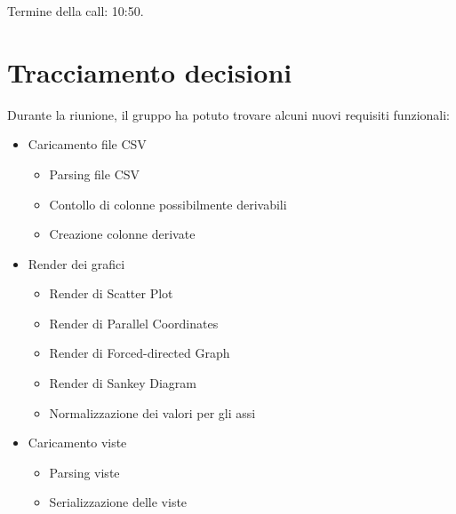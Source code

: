 \noindent Termine della call: 10:50.

\section{Tracciamento decisioni}


\noindent Durante la riunione, il gruppo ha potuto trovare alcuni nuovi requisiti funzionali: 
\begin{itemize}
	\item Caricamento file CSV
	\begin{itemize}
		\item Parsing file CSV
		\item Contollo di colonne possibilmente derivabili
		\item Creazione colonne derivate
	\end{itemize}
	\item Render dei grafici
	\begin{itemize}
		\item Render di Scatter Plot
		\item Render di Parallel Coordinates
		\item Render di Forced-directed Graph
		\item Render di Sankey Diagram
		\item Normalizzazione dei valori per gli assi
	\end{itemize}
	\item Caricamento viste
	\begin{itemize}
		\item Parsing viste
		\item Serializzazione delle viste
	\end{itemize}
\end{itemize}
